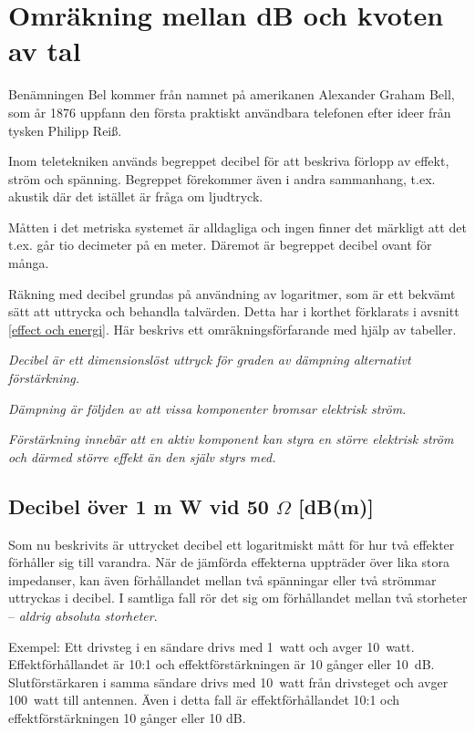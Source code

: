 \chapter{Omräkning mellan dB och kvoten av tal}
\label{decibel}

Benämningen Bel kommer från namnet på amerikanen Alexander Graham
Bell, som år 1876 uppfann den första praktiskt användbara telefonen
efter ideer från tysken Philipp Reiß.

Inom teletekniken används begreppet decibel för att beskriva förlopp
av effekt, ström och spänning. Begreppet förekommer även i andra
sammanhang, t.ex. akustik där det istället är fråga om ljudtryck.

Måtten i det metriska systemet är alldagliga och ingen finner det
märkligt att det t.ex. går tio decimeter på en meter. Däremot är
begreppet decibel ovant för många.

Räkning med decibel grundas på användning av logaritmer, som är ett
bekvämt sätt att uttrycka och behandla talvärden. Detta har i
korthet förklarats i avsnitt \ref{effect och energi}. Här beskrivs ett
omräkningsförfarande med hjälp av tabeller.

\emph{Decibel är ett dimensionslöst uttryck för graden av dämpning
  alternativt förstärkning.}

\emph{Dämpning är följden av att vissa komponenter bromsar elektrisk
  ström.}

\emph{Förstärkning innebär att en aktiv komponent kan styra en större
  elektrisk ström och därmed större effekt än den själv styrs med.}

\section{Decibel över 1 m W vid 50 \(\Omega\) [dB(m)]}

Som nu beskrivits är uttrycket decibel ett logaritmiskt mått för hur
två effekter förhåller sig till varandra. När de jämförda effekterna
uppträder över lika stora impedanser, kan även förhållandet mellan två
spänningar eller två strömmar uttryckas i decibel. I samtliga fall rör
det sig om förhållandet mellan två storheter -- \emph{aldrig absoluta
  storheter}.

Exempel: Ett drivsteg i en sändare drivs med 1~watt och avger 10~watt.
Effektförhållandet är 10:1 och effektförstärkningen är 10 gånger
eller 10~dB. Slutförstärkaren i samma sändare drivs med 10~watt från
drivsteget och avger 100~watt till antennen. Även i detta fall är
effektförhållandet 10:1 och effektförstärkningen 10 gånger eller 10
dB.

